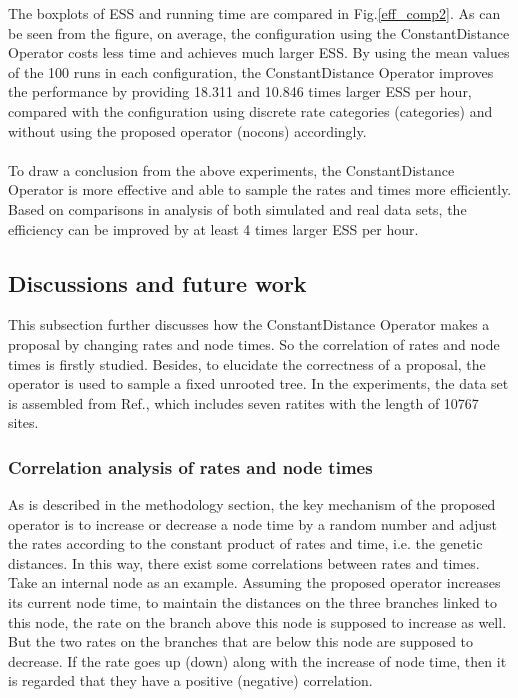 \documentclass{bmcart}
\begin{document}
The boxplots of ESS and running time are compared in Fig.\ref{eff_comp2}. As can be seen from the figure, on average, the configuration using the ConstantDistance Operator costs less time and achieves much larger ESS. By using the mean values of the 100 runs in each configuration, the ConstantDistance Operator improves the performance by providing 18.311 and 10.846 times larger ESS per hour, compared with the configuration using discrete rate categories (categories) and without using the proposed operator (nocons) accordingly. 
\\
\\
To draw a conclusion from the above experiments, the ConstantDistance Operator is more effective and able to sample the rates and times more efficiently. Based on comparisons in analysis of both simulated and real data sets, the efficiency can be improved by at least 4 times larger ESS per hour. 

\subsection*{Discussions and future work}
This subsection further discusses how the ConstantDistance Operator makes a proposal by changing rates and node times. So the correlation of rates and node times is firstly studied. Besides, to elucidate the correctness of a proposal, the operator is used to sample a fixed unrooted tree. In the experiments, the data set is assembled from Ref.\cite{cooper2001complete}, which includes seven ratites with the length of 10767 sites. 
\subsubsection*{Correlation analysis of rates and node times}
As is described in the methodology section, the key mechanism of the proposed operator is to increase or decrease a node time by a random number and adjust the rates according to the constant product of rates and time, i.e. the genetic distances. In this way, there exist some correlations between rates and times. Take an internal node as an example. Assuming the proposed operator increases its current node time, to maintain the distances on the three branches linked to this node, the rate on the branch above this node is supposed to increase as well. But the two rates on the branches that are below this node are supposed to decrease. If the rate goes up (down) along with the increase of node time, then it is regarded that they have a positive (negative) correlation. 
\end{document}
